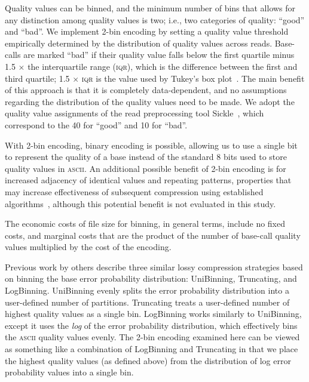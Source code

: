 \documentclass{bmcart}
\begin{document}
Quality values can be binned, and the minimum number of bins that
allows for any distinction among quality values is two; i.e., two
categories of quality: ``good'' and ``bad''. We implement 2-bin
encoding by setting a quality value threshold empirically determined
by the distribution of quality values across reads. Base-calls are
marked ``bad'' if their quality value falls below the first quartile
minus 1.5 $\times$ the interquartile range (\textsc{iqr}), which is
the difference between the first and third quartile; 1.5 $\times$
\textsc{iqr} is the value used by Tukey's box
plot~\cite{mcgill1978variations}. The main benefit of this approach is
that it is completely data-dependent, and no assumptions regarding the
distribution of the quality values need to be made. We adopt the
quality value assignments of the read preprocessing tool
Sickle~\cite{sickle}, which correspond to the 40 for ``good'' and 10
for ``bad''.

With 2-bin encoding, binary encoding is possible, allowing us to use a
single bit to represent the quality of a base instead of the standard
8 bits used to store quality values in \textsc{ascii}. An additional
possible benefit of 2-bin encoding is for increased adjacency of
identical values and repeating patterns, properties that may increase
effectiveness of subsequent compression using established
algorithms~\cite{HUFFMAN:1952nr,Ziv77auniversal,
  DBLP:journals/tit/ZivL78}, although this potential benefit is not
evaluated in this study.

The economic costs of file size for binning, in general terms, include
no fixed costs, and marginal costs that are the product of the number
of base-call quality values multiplied by the cost of the encoding.

Previous work by others \cite{Wan:2012kq} describe three similar lossy
compression strategies based on binning the base error probability
distribution: UniBinning, Truncating, and LogBinning. UniBinning
evenly splits the error probability distribution into a user-defined
number of partitions. Truncating treats a user-defined number of
highest quality values as a single bin. LogBinning works similarly to
UniBinning, except it uses the \emph{log} of the error probability
distribution, which effectively bins the \textsc{ascii} quality values
evenly. The 2-bin encoding examined here can be viewed as something
like a combination of LogBinning and Truncating in that we place the
highest quality values (as defined above) from the distribution of log
error probability values into a single bin.
\end{document}
